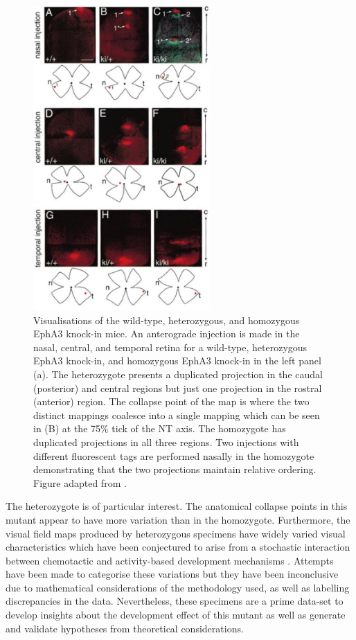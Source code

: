 \begin{figure}
	\centering
	\includegraphics[width = 0.6\textwidth]{images/introduction/epha3anatomical}
	\def\c{Visualisations of the wild-type, heterozygous, and homozygous EphA3 knock-in mice. }
	\caption[\c]{\label{fig:epha3anatomical} \c An anterograde injection is made in the nasal, central, and temporal retina for a wild-type, heterozygous EphA3 knock-in, and homozygous EphA3 knock-in in the left panel (a). The heterozygote presents a duplicated projection in the caudal (posterior) and central regions but just one projection in the rostral (anterior) region. The collapse point of the map is where the two distinct mappings coalesce into a single mapping which can be seen in (B) at the 75\% tick of the NT axis. The homozygote has duplicated projections in all three regions. Two injections with different fluorescent tags are performed nasally in the homozygote demonstrating that the two projections maintain relative ordering. Figure adapted from \cite{Brown2000-da}.}
\end{figure}

The heterozygote is of particular interest. The anatomical collapse points in this mutant appear to have more variation than in the homozygote. Furthermore, the visual field maps produced by heterozygous specimens have widely varied visual characteristics which have been conjectured to arise from a stochastic interaction between chemotactic and activity-based development mechanisms \cite{Owens2015-zv}. Attempts have been made to categorise these variations but they have been inconclusive due to mathematical considerations of the methodology used, as well as labelling discrepancies in the data. Nevertheless, these specimens are a prime data-set to develop insights about the development effect of this mutant as well as generate and validate hypotheses from theoretical considerations. 


